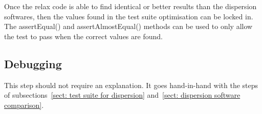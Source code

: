 Once the relax code is able to find identical or better results than the dispersion softwares, then the values found in the test suite optimisation can be locked in.  The assertEqual() and assertAlmostEqual() methods can be used to only allow the test to pass when the correct values are found.


\subsection{Debugging}

This step should not require an explanation.  It goes hand-in-hand with the steps of subsections~\ref{sect: test suite for dispersion} and~\ref{sect: dispersion software comparison}.
